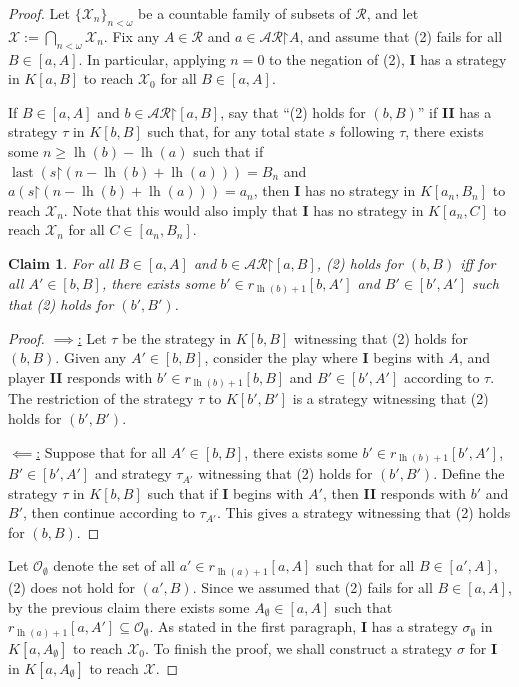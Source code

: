 \documentclass[11pt,reqno]{amsart}
\theoremstyle{plain}
\numberwithin{equation}{section}
\newtheorem*{claim}{Claim}
\theoremstyle{definition}
\newcommand{\func}{\operatorname}
\newcommand{\cal}{\mathcal}
\newcommand{\restrictedto}{\mathord{\upharpoonright}}
\newcommand{\X}{\cal{X}}
\newcommand{\lh}{\func{lh}}
\newcommand{\last}{\func{last}}
\renewcommand{\O}{\cal{O}}
\newenvironment{midproof}[1][Proof]
  {\begin{proof}[#1]\renewcommand{\qedsymbol}{$\blacksquare$}}
  {\end{proof}}
\begin{document}
\begin{proof}
    Let $\{\X_n\}_{n<\omega}$ be a countable family of subsets of $\cal{R}$, and let $\X := \bigcap_{n<\omega} \X_n$. Fix any $A \in \cal{R}$ and $a \in \cal{AR}\restrictedto A$, and assume that (2) fails for all $B \in [a,A]$. In particular, applying $n = 0$ to the negation of (2), \textbf{I} has a strategy in $K[a,B]$ to reach $\X_0$ for all $B \in [a,A]$.

    If $B \in [a,A]$ and $b \in \cal{AR}\restrictedto[a,B]$, say that ``(2) holds for $(b,B)$'' if \textbf{II} has a strategy $\tau$ in $K[b,B]$ such that, for any total state $s$ following $\tau$, there exists some $n \geq \lh(b) - \lh(a)$ such that if $\last(s\restrictedto(n - \lh(b) + \lh(a))) = B_n$ and $a(s\restrictedto(n - \lh(b) + \lh(a))) = a_n$, then \textbf{I} has no strategy in $K[a_n,B_n]$ to reach $\X_n$. Note that this would also imply that \textbf{I} has no strategy in $K[a_n,C]$ to reach $\X_n$ for all $C \in [a_n,B_n]$. 

    \begin{claim}
        For all $B \in [a,A]$ and $b \in \cal{AR}\restrictedto[a,B]$, (2) holds for $(b,B)$ iff for all $A' \in [b,B]$, there exists some $b' \in r_{\lh(b)+1}[b,A']$ and $B' \in [b',A']$ such that (2) holds for $(b',B')$.
    \end{claim}

    \begin{midproof}
        \underline{$\implies$:} Let $\tau$ be the strategy in $K[b,B]$ witnessing that (2) holds for $(b,B)$. Given any $A' \in [b,B]$, consider the play where \textbf{I} begins with $A$, and player \textbf{II} responds with $b' \in r_{\lh(b)+1}[b,B]$ and $B' \in [b',A']$ according to $\tau$. The restriction of the strategy $\tau$ to $K[b',B']$ is a strategy witnessing that (2) holds for $(b',B')$.

        \underline{$\impliedby$:} Suppose that for all $A' \in [b,B]$, there exists some $b' \in r_{\lh(b)+1}[b',A']$, $B' \in [b',A']$ and strategy $\tau_{A'}$ witnessing that (2) holds for $(b',B')$. Define the strategy $\tau$ in $K[b,B]$ such that if \textbf{I} begins with $A'$, then \textbf{II} responds with $b'$ and $B'$, then continue according to $\tau_{A'}$. This gives a strategy witnessing that (2) holds for $(b,B)$.
    \end{midproof}
    
    Let $\O_\emptyset$ denote the set of all $a' \in r_{\lh(a)+1}[a,A]$ such that for all $B \in [a',A]$, (2) does not hold for $(a',B)$. Since we assumed that (2) fails for all $B \in [a,A]$, by the previous claim there exists some $A_\emptyset \in [a,A]$ such that $r_{\lh(a)+1}[a,A'] \subseteq \O_\emptyset$. As stated in the first paragraph, \textbf{I} has a strategy $\sigma_\emptyset$ in $K[a,A_\emptyset]$ to reach $\X_0$. To finish the proof, we shall construct a strategy $\sigma$ for \textbf{I} in $K[a,A_\emptyset]$ to reach $\X$.
    

\end{proof}
\end{document}
